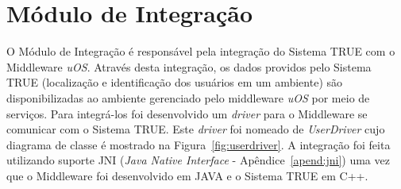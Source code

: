 \section{Módulo de Integração}
\label{sec:modulo-integracao}

	O Módulo de Integração é responsável pela integração do Sistema TRUE  com o
	Middleware \textit{uOS}. Através desta integração, os dados providos pelo Sistema TRUE (localização
	e identificação dos usuários em um ambiente) são disponibilizadas ao ambiente gerenciado pelo middleware \textit{uOS}
	por meio de serviços. Para integrá-los foi desenvolvido um \textit{driver} para o Middleware se comunicar
	com o Sistema TRUE. Este \textit{driver} foi nomeado de \textit{UserDriver} cujo diagrama de classe
	é mostrado na Figura~\ref{fig:userdriver}. A integração foi feita utilizando
	suporte JNI (\textit{Java Native Interface} - Apêndice~\ref{apend:jni}) uma vez que o Middleware foi desenvolvido em JAVA e o Sistema TRUE em C++.


